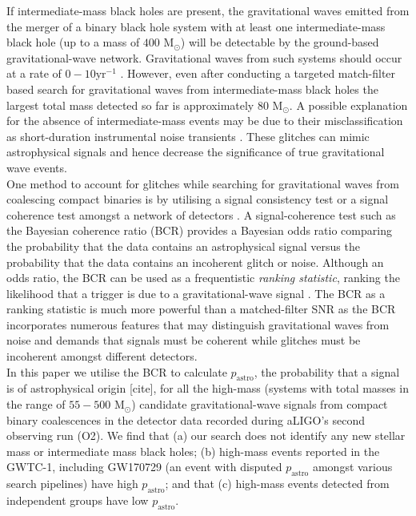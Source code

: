 \documentclass[%
 reprint,
 amsmath,amssymb,
 aps,
]{revtex4}
\newcommand{\bcr}{{\sc BCR}\xspace}
\newcommand{\pastro}{{$p_\text{astro}$}\xspace}
\newcommand{\msun}{{M${}_\odot$}\xspace}
\begin{document}
If intermediate-mass black holes are present, the gravitational waves emitted from the merger of a binary black hole system with at least one intermediate-mass black hole (up to a mass of $400$ \msun) will be detectable by the ground-based gravitational-wave network. Gravitational waves from such systems should occur at a rate of $0-10\text{yr}^{-1}$ \cite{fregeau2006imbhbRatePrediction, mandel2008rates,rodriguez2015bbhRatePredictions}.  However, even after conducting a targeted match-filter based search for gravitational waves from intermediate-mass black holes the largest total mass detected so far is approximately $80$ \msun \cite{salemi2019search, abbott2019gwtc}. A possible explanation for the absence of intermediate-mass events may be due to their misclassification as short-duration instrumental noise transients \cite{gli blip_glitches}. These glitches can mimic astrophysical signals and hence decrease the significance of true gravitational wave events. \\



One method to account for glitches while searching for gravitational waves from coalescing compact binaries is by utilising a signal consistency test \cite{pycbc_short_duration_transients} or a signal coherence test amongst a network of detectors \cite{bci, bcr_paper,  bcr_gw151216, bayesian_odds}. A signal-coherence test such as the Bayesian coherence ratio (\bcr) \cite{bcr_paper} provides a Bayesian odds ratio comparing the probability that the data contains an astrophysical signal versus the probability that the data contains an incoherent glitch or noise. Although an odds ratio, the \bcr can be used  as a frequentistic \textit{ranking statistic}, ranking the likelihood that a trigger is due to a gravitational-wave signal \cite{bcr_paper}. The \bcr as a ranking statistic is much more powerful than a matched-filter SNR as the \bcr incorporates numerous features that may distinguish gravitational waves from noise and demands that signals must be coherent while glitches must be incoherent amongst different detectors. \\

 In this paper we utilise the \bcr to calculate \pastro, the probability that a signal is of astrophysical origin [cite],  for all the high-mass (systems with total masses in the range of $55-500$ \msun) candidate gravitational-wave signals from compact binary coalescences in the detector data recorded during aLIGO's second observing run (O2).  We find that (a) our search does not identify any new stellar mass or intermediate mass black holes; (b) high-mass events reported in the GWTC-1, including GW170729 (an event with disputed $p_\text{astro}$ amongst various search pipelines) have high \pastro; and that (c) high-mass events detected from independent groups have low \pastro. \\
\end{document}
